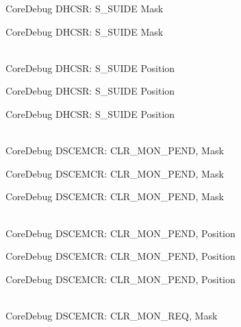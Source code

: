 \begin{DoxyRefList}
\label{deprecated__deprecated000467}%
%
Core\+Debug DHCSR:\+ S\+\_\+\+SUIDE Mask 

\label{deprecated__deprecated000569}%
%
Core\+Debug DHCSR:\+ S\+\_\+\+SUIDE Mask  
\item[{\parbox[t]{\linewidth}{Global \doxylink{group__CMSIS__SCB_gacff001d7e8c9665a1dc91018f2505d3d}{Core\+Debug\+\_\+\+DHCSR\+\_\+\+S\+\_\+\+SUIDE\+\_\+\+Pos} }}]\hfill \\
\label{deprecated__deprecated000015}%
%
Core\+Debug DHCSR:\+ S\+\_\+\+SUIDE Position 

\label{deprecated__deprecated000466}%
%
Core\+Debug DHCSR:\+ S\+\_\+\+SUIDE Position 

\label{deprecated__deprecated000568}%
%
Core\+Debug DHCSR:\+ S\+\_\+\+SUIDE Position  
\item[{\parbox[t]{\linewidth}{Global \doxylink{group__CMSIS__SCB_gacfb17801664286ab627a094d5fb3da20}{Core\+Debug\+\_\+\+DSCEMCR\+\_\+\+CLR\+\_\+\+MON\+\_\+\+PEND\+\_\+\+Msk} }}]\hfill \\
\label{deprecated__deprecated000074}%
%
Core\+Debug DSCEMCR:\+ CLR\+\_\+\+MON\+\_\+\+PEND, Mask 

\label{deprecated__deprecated000525}%
%
Core\+Debug DSCEMCR:\+ CLR\+\_\+\+MON\+\_\+\+PEND, Mask 

\label{deprecated__deprecated000627}%
%
Core\+Debug DSCEMCR:\+ CLR\+\_\+\+MON\+\_\+\+PEND, Mask  
\item[{\parbox[t]{\linewidth}{Global \doxylink{group__CMSIS__SCB_ga2295235d9c595bd6f287728f4c395bbf}{Core\+Debug\+\_\+\+DSCEMCR\+\_\+\+CLR\+\_\+\+MON\+\_\+\+PEND\+\_\+\+Pos} }}]\hfill \\
\label{deprecated__deprecated000073}%
%
Core\+Debug DSCEMCR:\+ CLR\+\_\+\+MON\+\_\+\+PEND, Position 

\label{deprecated__deprecated000524}%
%
Core\+Debug DSCEMCR:\+ CLR\+\_\+\+MON\+\_\+\+PEND, Position 

\label{deprecated__deprecated000626}%
%
Core\+Debug DSCEMCR:\+ CLR\+\_\+\+MON\+\_\+\+PEND, Position  
\item[{\parbox[t]{\linewidth}{Global \doxylink{group__CMSIS__SCB_gaea36b8cede2cc1184176eb20b7bd0f8d}{Core\+Debug\+\_\+\+DSCEMCR\+\_\+\+CLR\+\_\+\+MON\+\_\+\+REQ\+\_\+\+Msk} }}]\hfill \\
\label{deprecated__deprecated000072}%
%
Core\+Debug DSCEMCR:\+ CLR\+\_\+\+MON\+\_\+\+REQ, Mask 


\end{DoxyRefList}
